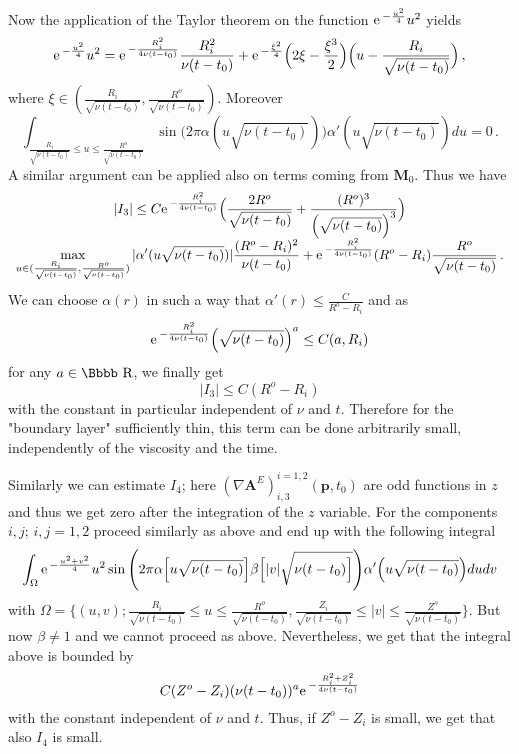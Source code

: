 \documentclass[12pt,twoside]{article}
\newcommand{\bA}{\mathbf{A}}
\def \al{\alpha}  \def \be{\beta}    \def \ga{\gamma}
\newcommand {\ee}{{\rm e}\,}
\newcommand {\rdd}{\mbox{\Bbbb R}}
\newcommand {\bM}{{\mathbf{M}}}
\newcommand {\bp}{{\mathbf{p}}}
\begin{document}
Now the application of the Taylor theorem on the function $\ee^{-\frac{u^2}{4}} u^2$
yields 
$$
\ee^{-\frac{u^2}{4}} u^2 = \ee^{- \frac{R_i^2}{4 \nu (t-t_0)}} \frac{R_i^2}
{\nu (t-t_0)} + \ee^{-\frac {\xi^2}{4}} \Big(2\xi - \frac{\xi^3}{2}\Big) 
\Big(u-\frac
{R_i}
{\sqrt{\nu (t-t_0)}}\Big)\, ,
$$
where $\xi \in (\frac {R_i} {\sqrt{\nu (t-t_0)}}, \frac {R^o} 
{\sqrt{\nu (t-t_0)}})$. Moreover
$$
\int_{\frac{R_i}{\sqrt{\nu(t-t_0)}} \leq u \leq 
\frac{R^o}{\sqrt{\nu(t-t_0)}} } \sin \Big(2\pi \al(u \sqrt
{\nu(t-t_0)})\Big) \al'(u\sqrt {\nu(t-t_0)}) d u = 0\, .
$$
A similar argument can be applied also on terms coming from $\bM_0$. Thus
we have
$$
\begin{array}{c}
\displaystyle 
|I_3| \leq C\ee^{-\frac{R_i^2}{4\nu (t-t_0)}} \Big(\frac {2 R^o}{\sqrt{\nu 
(t-t_0)}} + \frac {(R^o)^3}{\Big(\sqrt{\nu 
(t-t_0)}\Big)^3}\Big) \\[6pt]
\displaystyle \max_{u \in (\frac {R_i}{\sqrt{\nu (t-t_0)}},\frac 
{R^o}{\sqrt{\nu (t-t_0)}})}|\al'(u \sqrt{\nu (t-t_0)})| \frac{(R^o-R_i)^2}
{\nu(t-t_0)} +\ee^{-\frac{R_i^2}{4\nu (t-t_0)}} (R^o-R_i)\frac{R^o}
{\sqrt{\nu(t-t_0)}}\, .
\end{array}
$$
We can choose $\al(r)$ in such a way that $\al'(r) \leq \frac{C}{R^o-R_i}$ and
as 
$$
\ee^{-\frac{R_i^2}{4\nu (t-t_0)}} \Big(\sqrt{\nu (t-t_0)}\Big)^a \leq C(a, R_i)
$$
for any $a \in \rdd$, we finally get
$$
|I_3| \leq C (R^o-R_i)
$$
with the constant in particular independent of $\nu$ and $t$. Therefore for 
the "boundary layer" sufficiently thin, this term can be done arbitrarily 
small, independently of the viscosity and the time.

Similarly we can estimate $I_4$; here $(\nabla \bA^E)_{i,3}^{i=1,2}(\bp,t_0)$
are odd functions in $z$ and thus we get zero after the integration of 
the $z$ variable. 
For the components $i,j$; $i,j=1,2$ proceed similarly as above and end up with 
the following integral
$$
\int_\Omega \ee^{-\frac{u^2+v^2}{4}} 
u^2 \sin \Bigg(2\pi \al\Big[u \sqrt
{\nu(t-t_0)}\Big] \be\Big[|v|\sqrt{\nu (t-t_0)\Big]}\Bigg) \al'\Big(u\sqrt {\nu(t-t_0)}
\Big) d u d v
$$
with $\Omega =\{(u,v); \frac{R_i}{\sqrt{\nu(t-t_0)}} \leq u \leq 
\frac{R^o}{\sqrt{\nu(t-t_0)}},   \frac{Z_i}{\sqrt{\nu (t-t_0)}} \leq |v|
\leq \frac{Z^o}{\sqrt{\nu(t-t_0)}}\}$. 
But now $\be \neq 1$ and we cannot proceed as above. Nevertheless, we get
that the integral above is bounded by
$$
C (Z^o-Z_i) (\nu (t-t_0))^a \ee^{-\frac{R_i^2 + Z_i^2}{4\nu (t-t_0)}}
$$
with the constant independent of $\nu$ and $t$.
Thus, if $Z^o-Z_i$ is small, we get that also $I_4$ is small.
\end{document}

